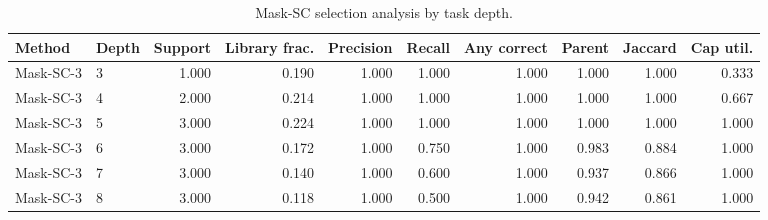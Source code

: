 \begin{table}[ht]
    \caption{Mask-SC selection analysis by task depth.}
    \label{tbl:masksc_selection_depth}
    \centering
    \scriptsize
    \begin{tabular}{llrrrrrrrr}
    \toprule
Method & Depth & Support & Library frac. & Precision & Recall & Any correct & Parent & Jaccard & Cap util. \\
    \midrule
Mask-SC-3 & 3 & 1.000 & 0.190 & 1.000 & 1.000 & 1.000 & 1.000 & 1.000 & 0.333 \\
Mask-SC-3 & 4 & 2.000 & 0.214 & 1.000 & 1.000 & 1.000 & 1.000 & 1.000 & 0.667 \\
Mask-SC-3 & 5 & 3.000 & 0.224 & 1.000 & 1.000 & 1.000 & 1.000 & 1.000 & 1.000 \\
Mask-SC-3 & 6 & 3.000 & 0.172 & 1.000 & 0.750 & 1.000 & 0.983 & 0.884 & 1.000 \\
Mask-SC-3 & 7 & 3.000 & 0.140 & 1.000 & 0.600 & 1.000 & 0.937 & 0.866 & 1.000 \\
Mask-SC-3 & 8 & 3.000 & 0.118 & 1.000 & 0.500 & 1.000 & 0.942 & 0.861 & 1.000 \\
    \bottomrule
    \end{tabular}
\end{table}
